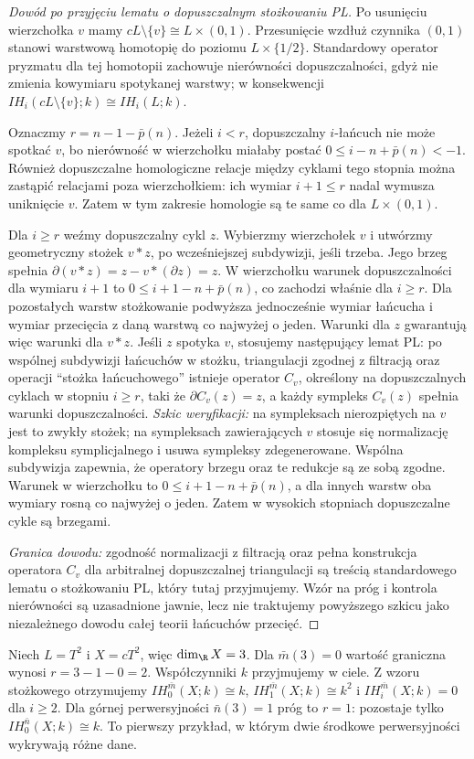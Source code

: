 \begin{proof}[Dowód po przyjęciu lematu o dopuszczalnym stożkowaniu PL]
Po usunięciu wierzchołka $v$ mamy
$cL\setminus\{v\}\cong L\times(0,1)$.
Przesunięcie wzdłuż czynnika $(0,1)$ stanowi
warstwową homotopię do poziomu $L\times\{1/2\}$.
Standardowy operator pryzmatu dla tej homotopii
zachowuje nierówności dopuszczalności, gdyż nie
zmienia kowymiaru spotykanej warstwy; w konsekwencji
$IH_i(cL\setminus\{v\};k)\cong IH_i(L;k)$.

Oznaczmy $r=n-1-\bar p(n)$.
Jeżeli $i<r$, dopuszczalny $i$-łańcuch nie może
spotkać $v$, bo nierówność w wierzchołku miałaby
postać $0\le i-n+\bar p(n)<-1$.
Również dopuszczalne homologiczne relacje między
cyklami tego stopnia można zastąpić relacjami poza
wierzchołkiem: ich wymiar $i+1\le r$ nadal wymusza
uniknięcie $v$. Zatem w tym zakresie homologie są
te same co dla $L\times(0,1)$.

Dla $i\ge r$ weźmy dopuszczalny cykl $z$.
Wybierzmy wierzchołek $v$ i utwórzmy geometryczny
stożek $v*z$, po wcześniejszej subdywizji, jeśli
trzeba. Jego brzeg spełnia
$\partial(v*z)=z-v*(\partial z)=z$.
W wierzchołku warunek dopuszczalności dla wymiaru
$i+1$ to $0\le i+1-n+\bar p(n)$, co zachodzi
właśnie dla $i\ge r$. Dla pozostałych warstw
stożkowanie podwyższa jednocześnie wymiar łańcucha
i wymiar przecięcia z daną warstwą co najwyżej
o jeden. Warunki dla $z$ gwarantują więc warunki
dla $v*z$. Jeśli $z$ spotyka $v$, stosujemy następujący
lemat PL: po wspólnej subdywizji łańcuchów w
stożku, triangulacji zgodnej z filtracją oraz
operacji ``stożka łańcuchowego'' istnieje operator
$C_v$, określony na dopuszczalnych cyklach w
stopniu $i\ge r$, taki że
$\partial C_v(z)=z$, a każdy sympleks $C_v(z)$
spełnia warunki dopuszczalności. \emph{Szkic weryfikacji:}
na sympleksach nierozpiętych na $v$ jest to zwykły
stożek; na sympleksach zawierających $v$ stosuje się
normalizację kompleksu symplicjalnego i usuwa
sympleksy zdegenerowane. Wspólna subdywizja
zapewnia, że operatory brzegu oraz te redukcje
są ze sobą zgodne. Warunek w wierzchołku to
$0\le i+1-n+\bar p(n)$, a dla innych warstw
oba wymiary rosną co najwyżej o jeden.
Zatem w wysokich stopniach dopuszczalne cykle
są brzegami.

\emph{Granica dowodu:} zgodność normalizacji z
filtracją oraz pełna konstrukcja operatora $C_v$
dla arbitralnej dopuszczalnej triangulacji są
treścią standardowego lematu o stożkowaniu PL,
który tutaj przyjmujemy. Wzór na próg i
kontrola nierówności są uzasadnione jawnie,
lecz nie traktujemy powyższego szkicu jako
niezależnego dowodu całej teorii łańcuchów
przecięć.
\end{proof}
\begin{przyklad}
\label{ex:torus-cone-xiii}
Niech $L=T^2$ i $X=cT^2$, więc $\dim_\R X=3$.
Dla $\bar m(3)=0$ wartość graniczna wynosi
$r=3-1-0=2$. Współczynniki $k$ przyjmujemy w ciele.
Z wzoru stożkowego otrzymujemy
$IH_0^{\bar m}(X;k)\cong k$,
$IH_1^{\bar m}(X;k)\cong k^2$ i
$IH_i^{\bar m}(X;k)=0$ dla $i\ge2$.
Dla górnej perwersyjności $\bar n(3)=1$ próg to $r=1$:
pozostaje tylko $IH_0^{\bar n}(X;k)\cong k$.
To pierwszy przykład, w którym dwie środkowe
perwersyjności wykrywają różne dane.
\end{przyklad}

